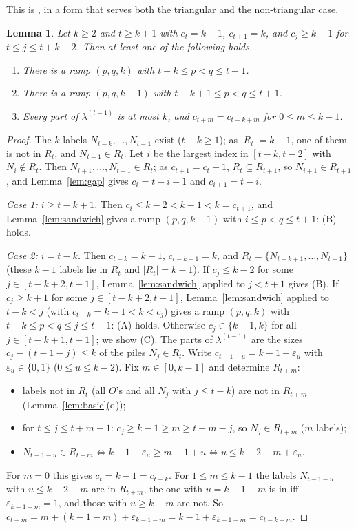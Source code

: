 \documentclass[11pt]{article}
\newtheorem{lemma}[theorem]{Lemma}
\theoremstyle{definition}
\newcommand{\R}{R}
\renewcommand{\le}{\leqslant}
\renewcommand{\ge}{\geqslant}
\begin{document}
This is \cite[Lemma~3.3(2) and Lemma~4.3(2)]{GH}, in a form that serves both the triangular and the
non-triangular case.

\begin{lemma}\label{lem:tail}
Let $k\ge2$ and $t\ge k+1$ with $c_t=k-1$, $c_{t+1}=k$, and $c_j\ge k-1$ for $t\le j\le t+k-2$.  Then at
least one of the following holds.
\begin{enumerate}
\item[(A)] There is a ramp $(p,q,k)$ with $t-k\le p<q\le t-1$.
\item[(B)] There is a ramp $(p,q,k-1)$ with $t-k+1\le p<q\le t+1$.
\item[(C)] Every part of $\lambda^{(t-1)}$ is at most $k$, and $c_{t+m}=c_{t-k+m}$ for $0\le m\le k-1$.
\end{enumerate}
\end{lemma}
\begin{proof}
The $k$ labels $N_{t-k},\dots,N_{t-1}$ exist ($t-k\ge1$); as $|\R_t|=k-1$, one of them is not in $\R_t$, and
$N_{t-1}\in \R_t$.  Let $i$ be the largest index in $[t-k,t-2]$ with $N_i\notin \R_t$.  Then
$N_{i+1},\dots,N_{t-1}\in \R_t$; as $c_{t+1}=c_t+1$, $\R_t\subseteq \R_{t+1}$, so $N_{i+1}\in \R_{t+1}$, and
Lemma~\ref{lem:gap} gives $c_i=t-i-1$ and $c_{i+1}=t-i$.

\emph{Case 1: $i\ge t-k+1$.}  Then $c_i\le k-2<k-1<k=c_{t+1}$, and Lemma~\ref{lem:sandwich} gives a ramp
$(p,q,k-1)$ with $i\le p<q\le t+1$: (B) holds.

\emph{Case 2: $i=t-k$.}  Then $c_{t-k}=k-1$, $c_{t-k+1}=k$, and $\R_t=\{N_{t-k+1},\dots,N_{t-1}\}$ (these $k-1$ labels lie in
$\R_t$ and $|\R_t|=k-1$).  If $c_j\le k-2$ for some $j\in[t-k+2,t-1]$, Lemma~\ref{lem:sandwich} applied to $j<t+1$ gives
(B).  If $c_j\ge k+1$ for some $j\in[t-k+2,t-1]$, Lemma~\ref{lem:sandwich} applied to $t-k<j$ (with
$c_{t-k}=k-1<k<c_j$) gives a ramp $(p,q,k)$ with $t-k\le p<q\le j\le t-1$: (A) holds.  Otherwise
$c_j\in\{k-1,k\}$ for all $j\in[t-k+1,t-1]$; we show (C).  The parts of $\lambda^{(t-1)}$ are the sizes
$c_j-(t-1-j)\le k$ of the piles $N_j\in \R_t$.  Write $c_{t-1-u}=k-1+\varepsilon_u$ with $\varepsilon_u\in\{0,1\}$
($0\le u\le k-2$).  Fix $m\in[0,k-1]$ and determine $\R_{t+m}$:
\begin{itemize}
\item labels not in $\R_t$ (all $O$'s and all $N_j$ with $j\le t-k$) are not in $\R_{t+m}$
(Lemma~\ref{lem:basic}(d));
\item for $t\le j\le t+m-1$: $c_j\ge k-1\ge m\ge t+m-j$, so $N_j\in \R_{t+m}$ ($m$ labels);
\item $N_{t-1-u}\in \R_{t+m}\iff k-1+\varepsilon_u\ge m+1+u\iff u\le k-2-m+\varepsilon_u$.
\end{itemize}
For $m=0$ this gives $c_t=k-1=c_{t-k}$.  For $1\le m\le k-1$ the labels $N_{t-1-u}$ with $u\le k-2-m$ are
in $\R_{t+m}$, the one with $u=k-1-m$ is in iff $\varepsilon_{k-1-m}=1$, and those with $u\ge k-m$ are not.  So
$c_{t+m}=m+(k-1-m)+\varepsilon_{k-1-m}=k-1+\varepsilon_{k-1-m}=c_{t-k+m}$.
\end{proof}
\end{document}
